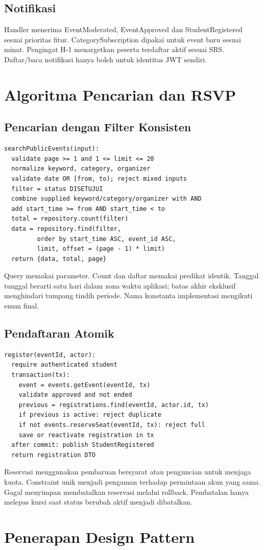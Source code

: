 \documentclass[11pt,a4paper]{article}
\newcommand{\page}[1]{\clearpage\section{#1}}
\begin{document}
\subsection{Notifikasi}
Handler menerima EventModerated, EventApproved dan StudentRegistered sesuai prioritas fitur. CategorySubscription dipakai untuk event baru sesuai minat. Pengingat H-1 menargetkan peserta terdaftar aktif sesuai SRS. Daftar/baca notifikasi hanya boleh untuk identitas JWT sendiri.
\page{Algoritma Pencarian dan RSVP}
\subsection{Pencarian dengan Filter Konsisten}
\begin{lstlisting}
searchPublicEvents(input):
  validate page >= 1 and 1 <= limit <= 20
  normalize keyword, category, organizer
  validate date OR [from, to); reject mixed inputs
  filter = status DISETUJUI
  combine supplied keyword/category/organizer with AND
  add start_time >= from AND start_time < to
  total = repository.count(filter)
  data = repository.find(filter,
         order by start_time ASC, event_id ASC,
         limit, offset = (page - 1) * limit)
  return {data, total, page}
\end{lstlisting}
Query memakai parameter. Count dan daftar memakai predikat identik. Tanggal tunggal berarti satu hari dalam zona waktu aplikasi; batas akhir eksklusif menghindari tumpang tindih periode. Nama konstanta implementasi mengikuti enum final.
\subsection{Pendaftaran Atomik}
\begin{lstlisting}
register(eventId, actor):
  require authenticated student
  transaction(tx):
    event = events.getEvent(eventId, tx)
    validate approved and not ended
    previous = registrations.find(eventId, actor.id, tx)
    if previous is active: reject duplicate
    if not events.reserveSeat(eventId, tx): reject full
    save or reactivate registration in tx
  after commit: publish StudentRegistered
  return registration DTO
\end{lstlisting}
Reservasi menggunakan pembaruan bersyarat atau penguncian untuk menjaga kuota. Constraint unik menjadi pengaman terhadap permintaan akun yang sama. Gagal menyimpan membatalkan reservasi melalui rollback. Pembatalan hanya melepas kursi saat status berubah aktif menjadi dibatalkan.
\page{Penerapan Design Pattern}
\end{document}
